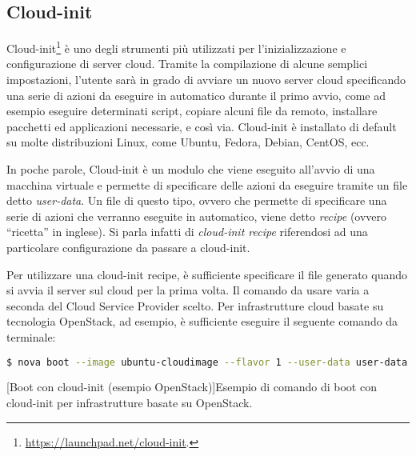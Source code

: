         \subsection{Cloud-init} \label{subsec:p;sl;cloud-init}
        
            Cloud-init\footnote{\url{https://launchpad.net/cloud-init}.} è uno degli strumenti più utilizzati per l'inizializzazione e configurazione di server cloud. Tramite la compilazione di alcune semplici impostazioni, l'utente sarà in grado di avviare un nuovo server cloud specificando una serie di azioni da eseguire in automatico durante il primo avvio, come ad esempio eseguire determinati script, copiare alcuni file da remoto, installare pacchetti ed applicazioni necessarie, e così via. Cloud-init è installato di default su molte distribuzioni Linux, come Ubuntu, Fedora, Debian, CentOS, ecc. \cite{cloud-init:readthedocs}
            
            In poche parole, Cloud-init è un modulo che viene eseguito all'avvio di una macchina virtuale e permette di specificare delle azioni da eseguire tramite un file detto \textit{user-data}. Un file di questo tipo, ovvero che permette di specificare una serie di azioni che verranno eseguite in automatico, viene detto \textit{recipe} (ovvero ``ricetta'' in inglese). Si parla infatti di \textit{cloud-init recipe} riferendosi ad una particolare configurazione da passare a cloud-init.
            
            Per utilizzare una cloud-init recipe, è sufficiente specificare il file  generato quando si avvia il server sul cloud per la prima volta. Il comando da usare varia a seconda del Cloud Service Provider scelto. Per infrastrutture cloud basate su tecnologia OpenStack, ad esempio, è sufficiente eseguire il seguente comando da terminale:
            
            \begin{center}
                \begin{lstlisting}[language=bash, gobble=18]
                    $ nova boot --image ubuntu-cloudimage --flavor 1 --user-data user-data
                \end{lstlisting}
                \captionsetup{textformat=empty,labelformat=empty} \vspace{-2em}
                [Boot con cloud-init (esempio OpenStack)]{Esempio di comando di boot con cloud-init per infrastrutture basate su OpenStack.}
            \end{center}
            
